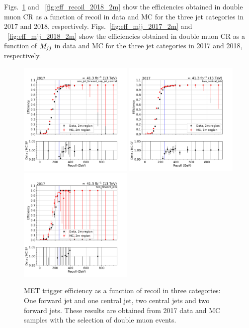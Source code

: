Figs.~\ref{fig:eff_recoil_2017_2m} and ~\ref{fig:eff_recoil_2018_2m} show the efficiencies obtained in double muon CR
as a function of recoil in data and MC for the three jet categories in 2017 and 2018, respectively.
Figs.~\ref{fig:eff_mjj_2017_2m} and ~\ref{fig:eff_mjj_2018_2m} show the efficiencies obtained in double muon CR
as a function of $M_{jj}$ in data and MC for the three jet categories in 2017 and 2018, respectively.

\begin{figure}[htp]
    \begin{center}
        \includegraphics[width=0.49\textwidth]{fig/efficiency/trigger/met/recoil/data_mc_comparison_2m_2017_one_jet_forward_one_jet_central.pdf}
        \includegraphics[width=0.49\textwidth]{fig/efficiency/trigger/met/recoil/data_mc_comparison_2m_2017_two_central_jets.pdf} \\
        \includegraphics[width=0.49\textwidth]{fig/efficiency/trigger/met/recoil/data_mc_comparison_2m_2017_two_forward_jets.pdf}
    \end{center}
    \caption{MET trigger efficiency as a function of recoil in three categories: One forward jet and one central jet, two central jets and
            two forward jets. These results are obtained from 2017 data and MC samples with the selection of double muon events.}
    \label{fig:eff_recoil_2017_2m}
\end{figure}

